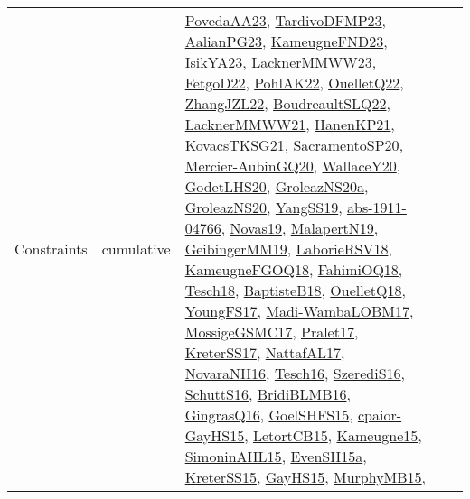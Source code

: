 {\begin{longtable}{lp{3cm}>{\raggedright}p{6cm}>{\raggedright}p{6cm}p{8cm}}
Constraints & cumulative & \href{papers/PovedaAA23.pdf}{PovedaAA23}\cite{PovedaAA23}, \href{papers/TardivoDFMP23.pdf}{TardivoDFMP23}\cite{TardivoDFMP23}, \href{papers/AalianPG23.pdf}{AalianPG23}\cite{AalianPG23}, \href{papers/KameugneFND23.pdf}{KameugneFND23}\cite{KameugneFND23}, \href{articles/IsikYA23.pdf}{IsikYA23}\cite{IsikYA23}, \href{articles/LacknerMMWW23.pdf}{LacknerMMWW23}\cite{LacknerMMWW23}, \href{articles/FetgoD22.pdf}{FetgoD22}\cite{FetgoD22}, \href{articles/PohlAK22.pdf}{PohlAK22}\cite{PohlAK22}, \href{papers/OuelletQ22.pdf}{OuelletQ22}\cite{OuelletQ22}, \href{papers/ZhangJZL22.pdf}{ZhangJZL22}\cite{ZhangJZL22}, \href{papers/BoudreaultSLQ22.pdf}{BoudreaultSLQ22}\cite{BoudreaultSLQ22}, \href{papers/LacknerMMWW21.pdf}{LacknerMMWW21}\cite{LacknerMMWW21}, \href{papers/HanenKP21.pdf}{HanenKP21}\cite{HanenKP21}, \href{papers/KovacsTKSG21.pdf}{KovacsTKSG21}\cite{KovacsTKSG21}, \href{articles/SacramentoSP20.pdf}{SacramentoSP20}\cite{SacramentoSP20}, \href{papers/Mercier-AubinGQ20.pdf}{Mercier-AubinGQ20}\cite{Mercier-AubinGQ20}, \href{articles/WallaceY20.pdf}{WallaceY20}\cite{WallaceY20}, \href{papers/GodetLHS20.pdf}{GodetLHS20}\cite{GodetLHS20}, \href{papers/GroleazNS20a.pdf}{GroleazNS20a}\cite{GroleazNS20a}, \href{papers/GroleazNS20.pdf}{GroleazNS20}\cite{GroleazNS20}, \href{papers/YangSS19.pdf}{YangSS19}\cite{YangSS19}, \href{articles/abs-1911-04766.pdf}{abs-1911-04766}\cite{abs-1911-04766}, \href{articles/Novas19.pdf}{Novas19}\cite{Novas19}, \href{papers/MalapertN19.pdf}{MalapertN19}\cite{MalapertN19}, \href{papers/GeibingerMM19.pdf}{GeibingerMM19}\cite{GeibingerMM19}, \href{articles/LaborieRSV18.pdf}{LaborieRSV18}\cite{LaborieRSV18}, \href{papers/KameugneFGOQ18.pdf}{KameugneFGOQ18}\cite{KameugneFGOQ18}, \href{articles/FahimiOQ18.pdf}{FahimiOQ18}\cite{FahimiOQ18}, \href{papers/Tesch18.pdf}{Tesch18}\cite{Tesch18}, \href{articles/BaptisteB18.pdf}{BaptisteB18}\cite{BaptisteB18}, \href{papers/OuelletQ18.pdf}{OuelletQ18}\cite{OuelletQ18}, \href{papers/YoungFS17.pdf}{YoungFS17}\cite{YoungFS17}, \href{papers/Madi-WambaLOBM17.pdf}{Madi-WambaLOBM17}\cite{Madi-WambaLOBM17}, \href{papers/MossigeGSMC17.pdf}{MossigeGSMC17}\cite{MossigeGSMC17}, \href{papers/Pralet17.pdf}{Pralet17}\cite{Pralet17}, \href{articles/KreterSS17.pdf}{KreterSS17}\cite{KreterSS17}, \href{articles/NattafAL17.pdf}{NattafAL17}\cite{NattafAL17}, \href{articles/NovaraNH16.pdf}{NovaraNH16}\cite{NovaraNH16}, \href{papers/Tesch16.pdf}{Tesch16}\cite{Tesch16}, \href{papers/SzerediS16.pdf}{SzerediS16}\cite{SzerediS16}, \href{papers/SchuttS16.pdf}{SchuttS16}\cite{SchuttS16}, \href{articles/BridiBLMB16.pdf}{BridiBLMB16}\cite{BridiBLMB16}, \href{papers/GingrasQ16.pdf}{GingrasQ16}\cite{GingrasQ16}, \href{articles/GoelSHFS15.pdf}{GoelSHFS15}\cite{GoelSHFS15}, \href{papers/cpaior-GayHS15.pdf}{cpaior-GayHS15}\cite{cpaior-GayHS15}, \href{articles/LetortCB15.pdf}{LetortCB15}\cite{LetortCB15}, \href{articles/Kameugne15.pdf}{Kameugne15}\cite{Kameugne15}, \href{articles/SimoninAHL15.pdf}{SimoninAHL15}\cite{SimoninAHL15}, \href{articles/EvenSH15a.pdf}{EvenSH15a}\cite{EvenSH15a}, \href{papers/KreterSS15.pdf}{KreterSS15}\cite{KreterSS15}, \href{papers/GayHS15.pdf}{GayHS15}\cite{GayHS15}, \href{papers/MurphyMB15.pdf}{MurphyMB15}\cite{MurphyMB15}, 
\end{longtable}}

